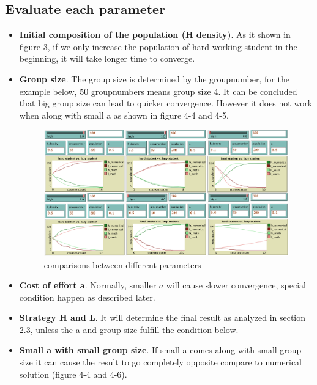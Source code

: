 \documentclass[a4paper, 12pt]{article}
\begin{document}
\subsection{Evaluate each parameter}
\begin{itemize}[nolistsep]
	\item \textbf{Initial composition of the population (H density)}. As it shown in figure 3, if we only increase the population of hard working student in the beginning, it will take longer time to converge.
	\item \textbf{Group size}. The group size is determined by the groupnumber, for the example below, 50 
	groupnumbers means group size 4. It can be concluded that big group size can lead to quicker convergence. However it does not work when along with small a as shown in figure 4-4 and 4-5.
		\begin{figure}[!h]
		\centering
		\includegraphics[width=6.5in]{./figures/all-comp}
		\vspace{-6mm}
		\caption{\footnotesize comparisons between different parameters}
		\label{comparison}
		\end{figure}
		\vspace{-3mm}
	\item \textbf{Cost of effort a}. Normally, smaller $a$ will cause slower convergence, special condition happen as described later.	
	\item \textbf{Strategy H and L}. It will determine the final result as analyzed in section 2.3, unless the a and group size fulfill the condition below. 
	\item \textbf{Small a with small group size}. If small a comes along with small group size it can cause the result to go completely opposite compare to numerical solution (figure 4-4 and 4-6).
\end{itemize}
\end{document}
